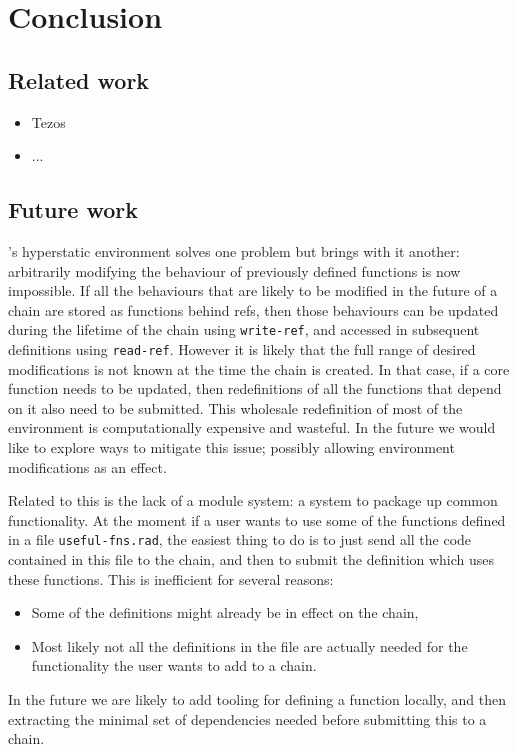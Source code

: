 \section{Conclusion}

\subsection{Related work}

\begin{itemize}
  \item Tezos
  \item ...
\end{itemize}

\subsection{Future work}

\rad's hyperstatic environment solves one problem but brings with it another:
arbitrarily modifying the behaviour of previously defined functions is now
impossible. If all the behaviours that are likely to be modified in the future of
a chain are stored as functions behind refs, then those behaviours can be
updated during the lifetime of the chain using \texttt{write-ref}, and accessed
in subsequent definitions using \texttt{read-ref}. However it is likely that the
full range of desired modifications is not known at the time the chain is
created. In that case, if a core function needs to be updated, then
redefinitions of all the functions that depend on it also need to be submitted.
This wholesale redefinition of most of the environment is computationally
expensive and wasteful. In the future we would like to explore ways to mitigate
this issue; possibly allowing environment modifications as an effect.

Related to this is the lack of a module system: a system to package up common
functionality. At the moment if a user wants to use some of the functions
defined in a file \texttt{useful-fns.rad}, the easiest thing to do is to just
send all the code contained in this file to the chain, and then to submit the
definition which uses these functions. This is inefficient for several reasons:
\begin{itemize}
  \item Some of the definitions might already be in effect on the chain,
  \item Most likely not all the definitions in the file are actually needed for
    the functionality the user wants to add to a chain.
\end{itemize}
In the future we are likely to add tooling for defining a function locally, and
then extracting the minimal set of dependencies needed before submitting this to
a chain.


